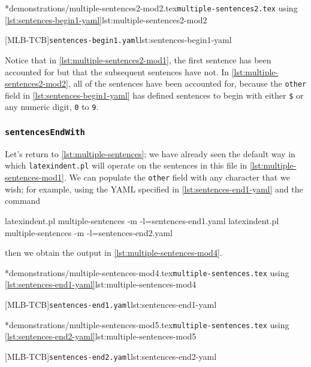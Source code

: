 	\begin{minipage}{.55\linewidth}
		\cmhlistingsfromfile*[showspaces=false]*{demonstrations/multiple-sentences2-mod2.tex}{\texttt{multiple-sentences2.tex} using \cref{lst:sentences-begin1-yaml}}{lst:multiple-sentences2-mod2}
	\end{minipage}
	\hfill
	\begin{minipage}{.45\linewidth}
		[MLB-TCB]{\texttt{sentences-begin1.yaml}}{lst:sentences-begin1-yaml}
	\end{minipage}
	Notice that in \cref{lst:multiple-sentences2-mod1}, the first sentence has been accounted for but that the subsequent sentences have not.
	In \cref{lst:multiple-sentences2-mod2}, all of the sentences have been accounted for, because the \texttt{other} field in \cref{lst:sentences-begin1-yaml} has defined sentences to begin with either \lstinline!$! or any numeric digit, \texttt{0} to \texttt{9}.

\subsubsection{\texttt{sentencesEndWith}}
	Let's return to \vref{lst:multiple-sentences}; we have already seen the default way in which \texttt{latexindent.pl} will operate on the sentences in this file in \vref{lst:multiple-sentences-mod1}.
	We can populate the \texttt{other} field with any character that we wish; for example, using the YAML specified in \cref{lst:sentences-end1-yaml} and the command \begin{commandshell}
latexindent.pl multiple-sentences -m -l=sentences-end1.yaml
latexindent.pl multiple-sentences -m -l=sentences-end2.yaml
\end{commandshell} then we obtain the output in \cref{lst:multiple-sentences-mod4}.

	\begin{minipage}{.5\linewidth}
		\cmhlistingsfromfile*[showspaces=false]*{demonstrations/multiple-sentences-mod4.tex}{\texttt{multiple-sentences.tex} using \cref{lst:sentences-end1-yaml}}{lst:multiple-sentences-mod4}
	\end{minipage}
	\hfill
	\begin{minipage}{.5\linewidth}
		[MLB-TCB]{\texttt{sentences-end1.yaml}}{lst:sentences-end1-yaml}
	\end{minipage}

	\begin{minipage}{.5\linewidth}
		\cmhlistingsfromfile*[showspaces=false]*{demonstrations/multiple-sentences-mod5.tex}{\texttt{multiple-sentences.tex} using \cref{lst:sentences-end2-yaml}}{lst:multiple-sentences-mod5}
	\end{minipage}
	\hfill
	\begin{minipage}{.5\linewidth}
		[MLB-TCB]{\texttt{sentences-end2.yaml}}{lst:sentences-end2-yaml}
	\end{minipage}

